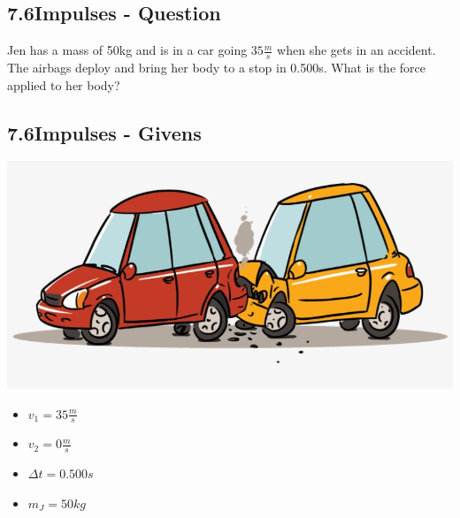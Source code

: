 \subsection*{7.6\hspace*{0.5cm}Impulses - Question}
Jen has a mass of 50kg and is in a car going $35\frac{m}{s}$ when she gets in an accident. The airbags deploy and bring her body to a stop in 0.500s. What is the force applied to her body?
\subsection*{7.6\hspace*{0.5cm}Impulses - Givens}
\begin{minipage}{0.5\textwidth}
    \includegraphics[scale=0.2]{./images/car_crash.png}
\end{minipage}
\begin{minipage}{0.5\textwidth}
    \begin{itemize}
        \item $v_{1} = 35\frac{m}{s}$
        \item $v_{2} = 0\frac{m}{s}$
        \item $\Delta t = 0.500s$
        \item $m_{J} = 50kg$
    \end{itemize}
\end{minipage}
